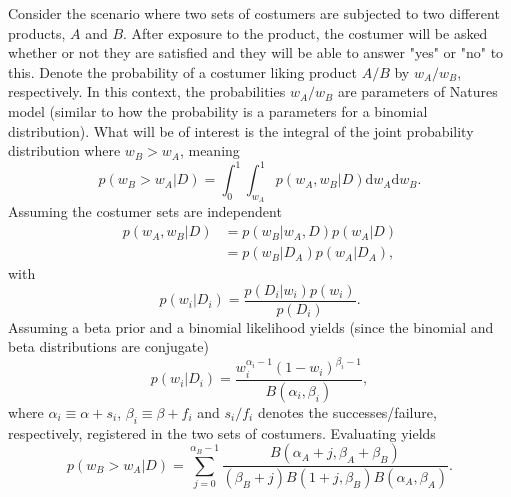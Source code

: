\begin{example}
	Consider the scenario where two sets of costumers are subjected to two different products, $A$ and $B$. After exposure to the product, the costumer will be asked whether or not they are satisfied and they will be able to answer "yes" or "no" to this. Denote the probability of a costumer liking product $A/B$ by $w_A/w_B$, respectively. In this context, the probabilities $w_A/w_B$ are parameters of Natures model (similar to how the probability is a parameters for a binomial distribution). What will be of interest is the integral of the joint probability distribution where $w_B>w_A$, meaning
	\begin{equation}
		p(w_B > w_A|D)= \int_0^1\int_{w_A}^1p(w_A,w_B|D)\mathrm{d}w_A\mathrm{d}w_B.
		\label{e1}
	\end{equation}
	Assuming the costumer sets are independent
	\begin{equation}
		\begin{split}
			p(w_A,w_B|D) &= p(w_B|w_A,D)p(w_A|D)\\
			& = p(w_B|D_A)p(w_A|D_A),
		\end{split}
	\end{equation}
	with
	\begin{equation}
		p(w_i|D_i)=\frac{p(D_i|w_i)p(w_i)}{p(D_i)}.
	\end{equation}
	Assuming a beta prior and a binomial likelihood yields (since the binomial and beta distributions are conjugate)
	\begin{equation}
		p(w_i|D_i)=\frac{w_i^{\alpha_i-1}(1-w_i)^{\beta_i-1}}{B(\alpha_i,\beta_i)},
	\end{equation}
	where $\alpha_i\equiv \alpha+s_i$, $\beta_i\equiv \beta+f_i$ and $s_i/f_i$ denotes the successes/failure, respectively, registered in the two sets of costumers. Evaluating  yields
	\begin{equation}
		p(w_B > w_A|D)= \sum_{j=0}^{\alpha_B-1}\frac{B(\alpha_A+j,\beta_A+\beta_B)}{(\beta_B+j)B(1+j,\beta_B)B(\alpha_A,\beta_A)}.
	\end{equation}
	
\end{example}